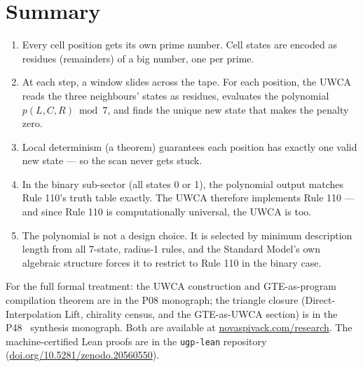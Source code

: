 \documentclass[11pt,a4paper]{article}
\begin{document}
\section{Summary}

\begin{tcolorbox}[colback=stateA,colframe=blue!50!black,title=The UWCA in plain English]
\begin{enumerate}
  \item Every cell position gets its own prime number.  Cell states are
        encoded as residues (remainders) of a big number, one per prime.

  \item At each step, a window slides across the tape.  For each position,
        the UWCA reads the three neighbours' states as residues, evaluates
        the polynomial $p(L, C, R) \bmod 7$, and finds the unique new state
        that makes the penalty zero.

  \item Local determinism (a theorem) guarantees each position has exactly
        one valid new state — so the scan never gets stuck.

  \item In the binary sub-sector (all states 0 or 1), the polynomial output
        matches Rule 110's truth table exactly.  The UWCA therefore
        implements Rule 110 — and since Rule 110 is computationally
        universal, the UWCA is too.

  \item The polynomial is not a design choice.  It is selected by minimum
        description length from all 7-state, radius-1 rules, and the
        Standard Model's own algebraic structure forces it to restrict to
        Rule 110 in the binary case.
\end{enumerate}
\end{tcolorbox}

\bigskip
\noindent For the full formal treatment: the UWCA construction and GTE-as-program
compilation theorem are in the P08 monograph; the triangle closure (Direct-Interpolation
Lift, chirality census, and the GTE-as-UWCA section) is in the P48~\cite{SpivackGTECompleteFramework} synthesis monograph.
Both are available at \href{https://novaspivack.com/research}{novaspivack.com/research}.
The machine-certified Lean proofs are in the \texttt{ugp-lean} repository
(\href{https://doi.org/10.5281/zenodo.20560550}{doi.org/10.5281/zenodo.20560550}).
\end{document}
